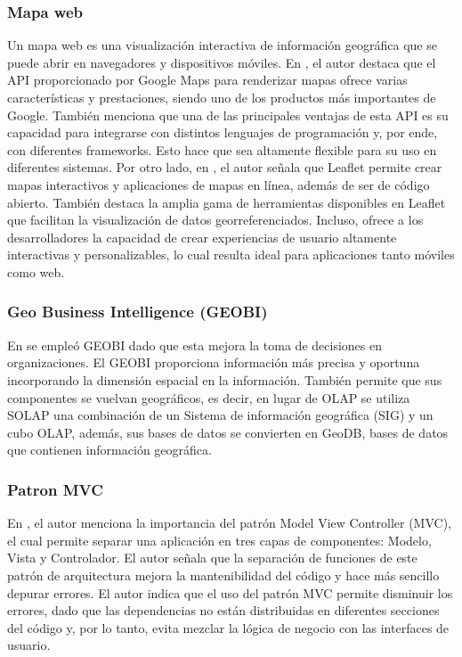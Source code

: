 \subsubsection{Mapa web}
Un mapa web es una visualización interactiva de información geográfica que se puede abrir en navegadores y dispositivos móviles.
En \cite{botto-tobarAppliedTechnologiesSecond2021}, el autor destaca que el API proporcionado por Google Maps para renderizar
mapas ofrece varias características y prestaciones, siendo uno de los productos más importantes de Google. También menciona que
una de las principales ventajas de esta API es su capacidad para integrarse con distintos lenguajes de programación y, por ende,
con diferentes frameworks. Esto hace que sea altamente flexible para su uso en diferentes sistemas. Por otro lado, en
\cite{gomezcantilloAplicativoMovilPara}, el autor señala que Leaflet permite crear mapas interactivos y aplicaciones de
mapas en línea, además de ser de código abierto. También destaca la amplia gama de herramientas disponibles en Leaflet que
facilitan la visualización de datos georreferenciados. Incluso, ofrece a los desarrolladores la capacidad de crear experiencias
de usuario altamente interactivas y personalizables, lo cual resulta ideal para aplicaciones tanto móviles como web.

\subsubsection{Geo Business Intelligence (GEOBI)}
En \cite{herreraGeoBIBigVGI2015} se empleó GEOBI dado que esta mejora la toma de decisiones en organizaciones. El
GEOBI proporciona información más precisa y oportuna incorporando la dimensión espacial en la información. También
permite que sus componentes se vuelvan geográficos, es decir, en lugar de OLAP se utiliza SOLAP una combinación de un
Sistema de información geográfica (SIG) y un cubo OLAP, además, sus bases de datos se convierten en GeoDB, bases de
datos que contienen información geográfica.

\subsubsection{Patron MVC}
En \cite{lesanoperezAplicativoMovilGeoubicacion2022}, el autor menciona la importancia del patrón Model View Controller
(MVC), el cual permite separar una aplicación en tres capas de componentes: Modelo, Vista y Controlador. El autor señala que
la separación de funciones de este patrón de arquitectura mejora la mantenibilidad del código y hace más sencillo depurar
errores. El autor indica que el uso del patrón MVC permite disminuir los errores, dado que las dependencias no están
distribuidas en diferentes secciones del código y, por lo tanto, evita mezclar la lógica de negocio con las interfaces
de usuario.

